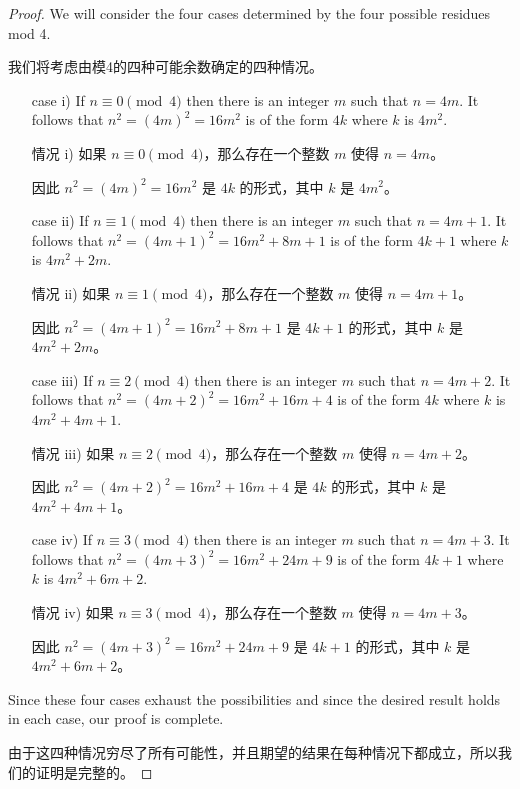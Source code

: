 \begin{proof}
      We will consider the four cases determined by the four
      possible residues mod 4.

      我们将考虑由模4的四种可能余数确定的四种情况。

      \begin{itemize}
            \item[case i)] If $n \equiv 0 \pmod{4}$ then there is an integer $m$
                  such that $n = 4m$.
                  It follows that $n^2 = (4m)^2 = 16m^2$ is of the
                  form $4k$ where $k$ is $4m^2$.

            \item[情况 i)] 如果 $n \equiv 0 \pmod{4}$，那么存在一个整数 $m$ 使得 $n = 4m$。

                  因此 $n^2 = (4m)^2 = 16m^2$ 是 $4k$ 的形式，其中 $k$ 是 $4m^2$。

            \item[case ii)] If $n \equiv 1 \pmod{4}$ then there is an integer $m$
                  such that $n = 4m+1$.
                  It follows that $n^2 = (4m+1)^2 = 16m^2 + 8m + 1$
                  is of the form $4k+1$ where $k$ is $4m^2+2m$.

            \item[情况 ii)] 如果 $n \equiv 1 \pmod{4}$，那么存在一个整数 $m$ 使得 $n = 4m+1$。

                  因此 $n^2 = (4m+1)^2 = 16m^2 + 8m + 1$ 是 $4k+1$ 的形式，其中 $k$ 是 $4m^2+2m$。

            \item[case iii)] If $n \equiv 2 \pmod{4}$ then there is an integer $m$
                  such that $n = 4m+2$.
                  It follows that $n^2 = (4m+2)^2 = 16m^2 + 16m + 4$
                  is of the form $4k$ where $k$ is $4m^2+4m+1$.

            \item[情况 iii)] 如果 $n \equiv 2 \pmod{4}$，那么存在一个整数 $m$ 使得 $n = 4m+2$。

                  因此 $n^2 = (4m+2)^2 = 16m^2 + 16m + 4$ 是 $4k$ 的形式，其中 $k$ 是 $4m^2+4m+1$。

            \item[case iv)] If $n \equiv 3 \pmod{4}$ then there is an integer $m$
                  such that $n = 4m+3$.
                  It follows that $n^2 = (4m+3)^2 = 16m^2 + 24m + 9$
                  is of the form $4k+1$ where $k$ is $4m^2+6m+2$.

            \item[情况 iv)] 如果 $n \equiv 3 \pmod{4}$，那么存在一个整数 $m$ 使得 $n = 4m+3$。


                  因此 $n^2 = (4m+3)^2 = 16m^2 + 24m + 9$ 是 $4k+1$ 的形式，其中 $k$ 是 $4m^2+6m+2$。
      \end{itemize}

      Since these four cases exhaust the possibilities and since the desired
      result holds in each case, our proof is complete.

      由于这四种情况穷尽了所有可能性，并且期望的结果在每种情况下都成立，所以我们的证明是完整的。
\end{proof}

